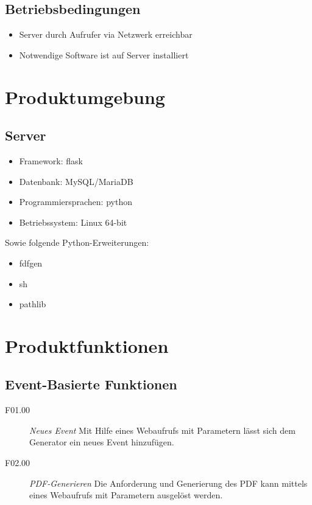 \documentclass[12pt,parskip=full, pagea4]{scrreprt}
\begin{document}
			\section{Betriebsbedingungen}
			
			\begin{itemize}
				\item Server durch Aufrufer via Netzwerk erreichbar
				\item Notwendige Software ist auf Server installiert
			\end{itemize}
		
		\chapter{Produktumgebung}
			
			\section{Server}
			
			\begin{itemize}
				\item Framework: flask
				\item Datenbank: MySQL/MariaDB
				\item Programmiersprachen: python
				\item Betriebssystem: Linux 64-bit
			\end{itemize}
		
			Sowie folgende Python-Erweiterungen:
			
			\begin{itemize}
				\item fdfgen
				\item sh
				\item pathlib
			\end{itemize}
		
		\chapter{Produktfunktionen}
		
			\section{Event-Basierte Funktionen}
			
			\begin{description}
				\item[F01.00]
				\textit{Neues Event}
				Mit Hilfe eines Webaufrufs mit Parametern lässt sich dem Generator ein neues Event hinzufügen.
				\item[F02.00]
				\textit{PDF-Generieren} 
				Die Anforderung und Generierung des PDF kann mittels eines Webaufrufs mit Parametern ausgel\"ost werden.
			\end{description}
			
\end{document}
